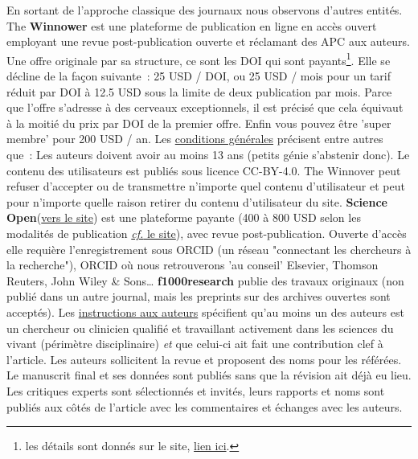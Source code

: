En sortant de l'approche classique des journaux nous observons d'autres entités.
The \textbf{Winnower} est une plateforme de publication en ligne en accès ouvert employant une revue post-publication ouverte et réclamant des APC aux auteurs.
Une offre originale par sa structure, ce sont les DOI qui sont payants\footnote{les détails sont donnés sur le site, \href{https://thewinnower.com/memberships}{lien ici}.
}.
Elle se décline de la façon suivante~: 25 USD / DOI, ou 25 USD / mois pour un tarif réduit par DOI à 12.5 USD sous la limite de deux publication par mois.
Parce que l'offre s'adresse à des cerveaux exceptionnels, il est précisé que cela équivaut à la moitié du prix par DOI de la premier offre.
Enfin vous pouvez être 'super membre' pour 200 USD / an.
Les \href{https://thewinnower.com/sign_up#terms_and_conditions}{conditions générales} précisent entre autres que~:
Les auteurs doivent avoir au moins 13 ans (petits génie s'abstenir donc).
Le contenu des utilisateurs est publiés sous licence CC-BY-4.0.
The Winnover peut refuser d'accepter ou de transmettre n'importe quel contenu d'utilisateur et peut pour n'importe quelle raison retirer du contenu d'utilisateur du site.
\textbf{Science Open}(\href{http://about.scienceopen.com/how-does-it-work/#more-9
}{vers le site}) est une plateforme payante (400 à 800 USD selon les modalités de publication \href{http://about.scienceopen.com/what-does-it-cost/}{\textit{cf.} le site}), avec revue post-publication.
Ouverte d'accès elle requière l'enregistrement sous ORCID (un réseau "connectant les chercheurs à la recherche"), ORCID où nous retrouverons 'au conseil' Elsevier, Thomson Reuters, John Wiley \& Sons\ldots
\textbf{f1000research} publie des travaux originaux (non publié dans un autre journal, mais les preprints sur des archives ouvertes sont acceptés).
Les \href{http://f1000research.com/for-authors/publish-your-research}{instructions aux auteurs} spécifient qu'au moins un des auteurs est un chercheur ou clinicien qualifié et travaillant activement dans les sciences du vivant (périmètre disciplinaire) \emph{et} que celui-ci ait fait une contribution clef à l'article.
Les auteurs sollicitent la revue et proposent des noms pour les référées.
Le manuscrit final et ses données sont publiés sans que la révision ait déjà eu lieu.
Les critiques experts sont sélectionnés et invités, leurs rapports et noms sont publiés aux côtés de l'article avec les commentaires et échanges avec les auteurs.
